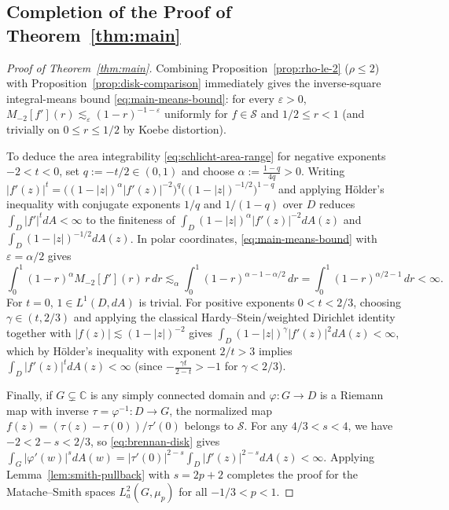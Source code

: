 \documentclass[12pt]{article}
\def\C{\mathbb{C}}
\def\S{\mathcal{S}}
\theoremstyle{definition}
\numberwithin{equation}{section}
\begin{document}
\subsection{Completion of the Proof of Theorem~\ref{thm:main}}

\begin{proof}[Proof of Theorem~\ref{thm:main}]
Combining Proposition~\ref{prop:rho-le-2} ($\rho \le 2$) with Proposition~\ref{prop:disk-comparison} immediately gives the inverse-square integral-means bound \eqref{eq:main-means-bound}: for every $\varepsilon > 0$, $M_{-2}[f'](r) \lesssim_\varepsilon (1-r)^{-1-\varepsilon}$ uniformly for $f \in \S$ and $1/2 \le r < 1$ (and trivially on $0 \le r \le 1/2$ by Koebe distortion).

To deduce the area integrability \eqref{eq:schlicht-area-range} for negative exponents $-2 < t < 0$, set $q := -t/2 \in (0, 1)$ and choose $\alpha := \frac{1-q}{4q} > 0$. Writing $|f'(z)|^t = \big((1-|z|)^\alpha |f'(z)|^{-2}\big)^q \big((1-|z|)^{-1/2}\big)^{1-q}$ and applying H\"older's inequality with conjugate exponents $1/q$ and $1/(1-q)$ over $D$ reduces $\int_D |f'|^t dA < \infty$ to the finiteness of $\int_D (1-|z|)^\alpha |f'(z)|^{-2} dA(z)$ and $\int_D (1-|z|)^{-1/2} dA(z)$. In polar coordinates, \eqref{eq:main-means-bound} with $\varepsilon = \alpha/2$ gives
\[
  \int_0^1 (1-r)^\alpha M_{-2}[f'](r)\, r\, dr \lesssim_\alpha \int_0^1 (1-r)^{\alpha - 1 - \alpha/2}\, dr = \int_0^1 (1-r)^{\alpha/2 - 1}\, dr < \infty.
\]
For $t = 0$, $1 \in L^1(D, dA)$ is trivial. For positive exponents $0 < t < 2/3$, choosing $\gamma \in (t, 2/3)$ and applying the classical Hardy--Stein/weighted Dirichlet identity together with $|f(z)| \lesssim (1-|z|)^{-2}$ gives $\int_D (1-|z|)^\gamma |f'(z)|^2 dA(z) < \infty$, which by H\"older's inequality with exponent $2/t > 3$ implies $\int_D |f'(z)|^t dA(z) < \infty$ (since $-\frac{\gamma t}{2 - t} > -1$ for $\gamma < 2/3$).

Finally, if $G \subsetneq \C$ is any simply connected domain and $\varphi : G \to D$ is a Riemann map with inverse $\tau = \varphi^{-1} : D \to G$, the normalized map $f(z) = (\tau(z)-\tau(0))/\tau'(0)$ belongs to $\S$. For any $4/3 < s < 4$, we have $-2 < 2 - s < 2/3$, so \eqref{eq:brennan-disk} gives $\int_G |\varphi'(w)|^s dA(w) = |\tau'(0)|^{2-s} \int_D |f'(z)|^{2-s} dA(z) < \infty$. Applying Lemma~\ref{lem:smith-pullback} with $s = 2p + 2$ completes the proof for the Matache--Smith spaces $L^2_a(G, \mu_p)$ for all $-1/3 < p < 1$.
\end{proof}
\end{document}
